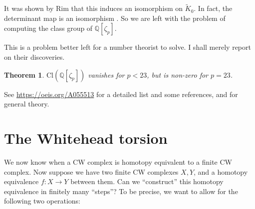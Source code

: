 \documentclass[a4paper, 12pt]{article}
\newtheorem{thm}{Theorem}[section]
\theoremstyle{definition}
\newcommand\Q{\mathbb{Q}}
\newcommand\Cl{\mathrm{Cl}}
\newcommand\fakeqed{\pushQED{\qed}\qedhere}
\begin{document}
It was shown by Rim \cite[Theorem 6.24]{modules-over-finite-groups} that this induces an isomorphism on $\tilde{K}_0$. In fact, the determinant map is an isomorphism \cite[Theorem 6.19]{modules-over-finite-groups}. So we are left with the problem of computing the class group of $\Q[\zeta_p]$.

This is a problem better left for a number theorist to solve. I shall merely report on their discoveries.
\begin{thm}
  $\Cl(\Q[\zeta_p])$ vanishes for $p < 23$, but is non-zero for $p = 23$.\fakeqed
\end{thm}
See \url{https://oeis.org/A055513} for a detailed list and some references, and \cite{washington-cyclotomic-fields} for general theory.

\section{The Whitehead torsion}
We now know when a CW complex is homotopy equivalent to a finite CW complex. Now suppose we have two finite CW complexes $X, Y$, and a homotopy equivalence $f: X \to Y$ between them. Can we ``construct'' this homotopy equivalence in finitely many ``steps''? To be precise, we want to allow for the following two operations:
\end{document}
